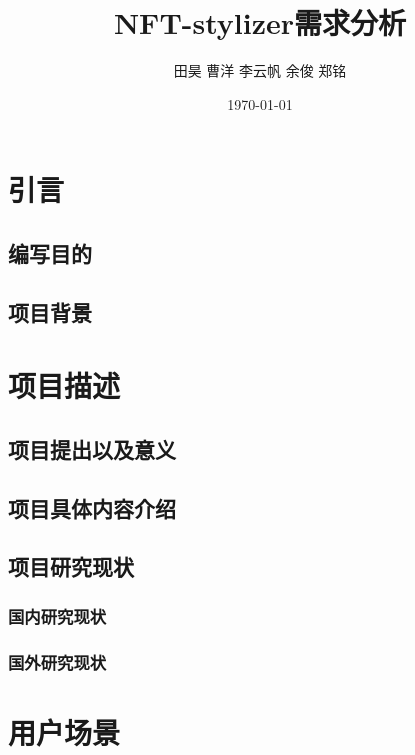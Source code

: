 \documentclass{ctexart}
\title{NFT-stylizer需求分析}
\author{田昊 曹洋 李云帆 余俊 郑铭}
\date{\today}
\begin{document}
\maketitle


\tableofcontents


\section{引言}

\subsection{编写目的}

\subsection{项目背景}

\section{项目描述}

\subsection{项目提出以及意义}

\subsection{项目具体内容介绍}

\subsection{项目研究现状}

\subsubsection{国内研究现状}

\subsubsection{国外研究现状}

\section{用户场景}
\end{document}
